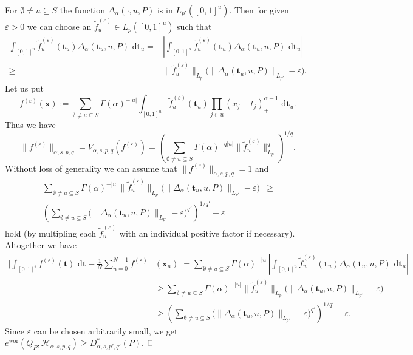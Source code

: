 \documentclass[12pt]{article}
\DeclareMathOperator{\wor}{wor}
\newenvironment{proof}{\begin{trivlist}
    \item[\hskip\labelsep{\it Proof.}]}{$\hfill\Box$\end{trivlist}}
\newcommand{\bsx}{\boldsymbol{x}}
\newcommand{\bst}{\boldsymbol{t}}
\newcommand{\rd}{\,\mathrm{d}}
\newcommand{\HH}{\mathcal{H}}
\begin{document}
\begin{proof}
For $\emptyset \neq u \subseteq S$ the function 
$\Delta_\alpha(\cdot,u,P)$
is in $L_{p'}([0,1]^{u})$. Then for given $\varepsilon >0$ we can
choose an
$\tilde{f}^{(\varepsilon)}_u\in L_p([0,1]^{u})$ such that
\begin{equation*}
\begin{split}
\int_{[0,1]^{u}} \tilde{f}^{(\varepsilon)}_u(\bst_u)
\Delta_\alpha(\bst_u,u,P) \,\rd \bst_u
 =& \left|\int_{[0,1]^{u}} \tilde{f}^{(\varepsilon)}_u(\bst_u)
\Delta_\alpha(\bst_u,u,P) \,\rd \bst_u
\right|\\
\ge& \|\tilde{f}^{(\varepsilon)}_u\|_{L_p}
\big( \|\Delta_\alpha(\bst_u,u,P)\|_{L_{p'}} - \varepsilon \big).
\end{split}
\end{equation*}
Let us put
\begin{equation*}
 f^{(\varepsilon)}(\bsx) := \sum_{\emptyset \neq u\subseteq S}
\Gamma(\alpha)^{-|u|}
\int_{[0,1]^{u}} \tilde{f}^{(\varepsilon)}_u(\bst_u) \prod_{j\in u} (x_j-t_j)^{\alpha-1}_+
\, \rd \bst_u.
\end{equation*}
Thus we have
$$\|f^{(\varepsilon)}\|_{\alpha,s,p,q} =
V_{\alpha,s,p,q}(f^{(\varepsilon)})
= \left( \sum_{\emptyset \neq u \subseteq S} \Gamma(\alpha)^{-q|u|} \|\tilde{f}^{(\varepsilon)}_u\|^{q}_{L_p} \right)^{1/q}.$$
Without loss of generality we can assume that $\|f^{(\varepsilon)}\|_{\alpha,s,p,q} = 1$ and
\begin{equation*}
\begin{split}
\sum_{\emptyset \neq u \subseteq S} \Gamma(\alpha)^{-|u|}
\|\tilde{f}^{(\varepsilon)}_u\|_{L_p}
\big( \|\Delta_\alpha(\bst_u,u,P)\|_{L_{p'}} -\varepsilon \big)& \ge \\
\left( \sum_{\emptyset \neq u \subseteq S}
\big( \|\Delta_\alpha(\bst_u,u,P)\|_{L_{p'}}-\varepsilon \big)^{q'}
\right)^{1/q'} -\varepsilon&
\end{split}
\end{equation*}
hold (by multipling each $\tilde{f}^{(\varepsilon)}_u$ with an
individual positive
factor if necessary).
Altogether we have
\begin{equation*}
 \begin{split}
\bigg| \int_{[0,1]^s} f^{(\varepsilon)}(\bst)\,\rd \bst -
\frac{1}{N} \sum_{n=0}^{N-1} f^{(\varepsilon)}&(\bsx_n) \bigg|
=
\sum_{\emptyset \neq u \subseteq S} \Gamma(\alpha)^{-|u|}
\left|  \int_{[0,1]^{u}} \tilde{f}^{(\varepsilon)}_u(\bst_u)
\Delta_\alpha(\bst_u,u,P) \,\rd \bst_u \right|\\
&\ge
\sum_{\emptyset \neq u \subseteq S} \Gamma(\alpha)^{-|u|}
\|\tilde{f}^{(\varepsilon)}_u\|_{L_p}
\big( \|\Delta_\alpha(\bst_u,u,P)\|_{L_{p'}} - \varepsilon \big)\\
&\ge
\left( \sum_{\emptyset \neq u \subseteq S}
\big( \|\Delta_\alpha(\bst_u,u,P)\|_{L_{p'}}-\varepsilon \big)^{q'}
\right)^{1/q'} -\varepsilon.
 \end{split}
\end{equation*}
Since $\varepsilon$ can be chosen arbitrarily small, we get
$e^{\wor}(Q_P,\HH_{\alpha,s,p,q}) \ge  D^\ast_{\alpha,s,p',q'}(P)$.
\end{proof}
\end{document}

